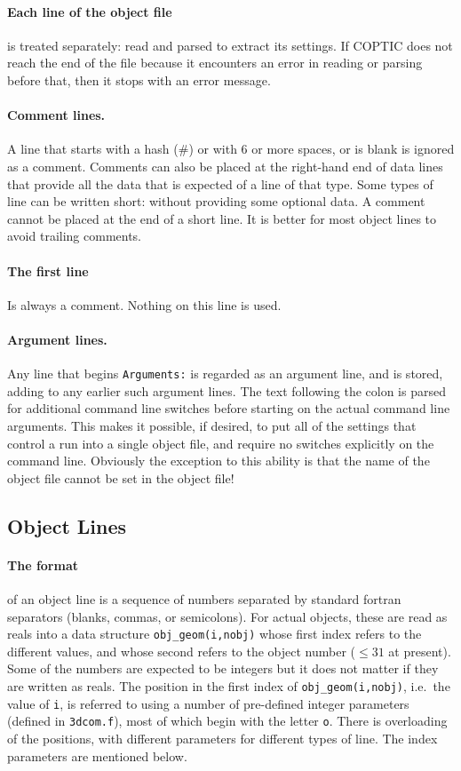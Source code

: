 \documentclass[12pt]{article}
\begin{document}
\paragraph{Each line of the object file} is treated separately: read and parsed to
extract its settings. If COPTIC does not reach the end of the file
because it encounters an error in reading or parsing before that, then
it stops with an error message.

\paragraph{Comment lines.} A line that starts with a hash (\#) 
or with 6 or more spaces, or is blank is ignored as a
comment. Comments can also be placed at the right-hand end of data
lines that provide all the data that is expected of a line of that
type. Some types of line can be written short: without providing some
optional data. A comment cannot be placed at the end of a short line.
It is better for most object lines to avoid trailing comments.

\paragraph{The first line} Is always a comment. Nothing on this line is used.

\paragraph{Argument lines.} Any line that begins \verb!Arguments:! is
regarded as an argument line, and is stored, adding to any earlier
such argument lines. The text following the colon is parsed for
additional command line switches before starting on the actual command
line arguments. This makes it possible, if desired, to put all of the
settings that control a run into a single object file, and require no
switches explicitly on the command line. Obviously the exception to
this ability is that the name of the object file cannot be set in the
object file!

\subsection{Object Lines}

\paragraph{The format} of an object line is a sequence of numbers
separated by standard fortran separators (blanks, commas, or
semicolons). For actual objects, these are read as reals into a data
structure \verb!obj_geom(i,nobj)! whose first index refers to the
different values, and whose second refers to the object number
($\le31$ at present).  Some of the numbers are expected to be integers
but it does not matter if they are written as reals. The position in
the first index of \verb!obj_geom(i,nobj)!, i.e.\ the value of
\verb!i!, is referred to using a number of pre-defined integer
parameters (defined in \verb!3dcom.f!), most of which begin with the
letter \verb!o!. There is overloading of the positions, with different
parameters for different types of line. The index parameters are
mentioned below.
\end{document}
